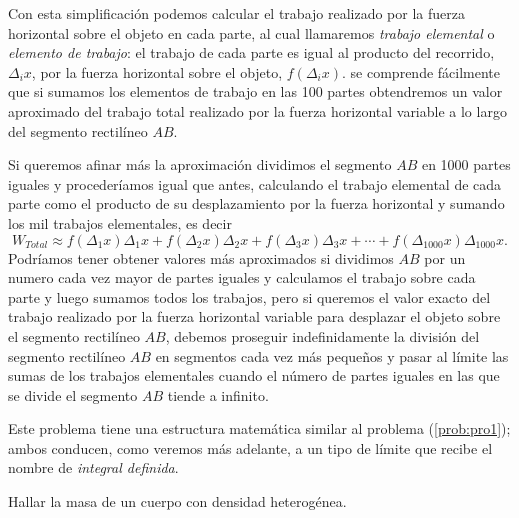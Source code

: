 \begin{solucion}
\begin{nota}
\end{nota}\vspace*{2pt} 

Con esta simplificación podemos calcular el trabajo realizado por
la fuerza horizontal sobre el objeto en cada parte, al cual llamaremos
\textsl{trabajo elemental} o \textsl{elemento de trabajo}: el trabajo
de cada parte es igual al producto del recorrido, $\Delta_{i}x$,
por la fuerza horizontal sobre el objeto, $f\left(\Delta_{i}x\right).$
se comprende fácilmente que si sumamos los elementos de trabajo en
las 100 partes obtendremos un valor aproximado del trabajo total realizado
por la fuerza horizontal variable a lo largo del segmento rectilíneo
$AB.$ 

Si queremos afinar más la aproximación dividimos el segmento $AB$
en 1000 partes iguales y procederíamos igual que antes, calculando
el trabajo elemental de cada parte como el producto de su desplazamiento
por la fuerza horizontal y sumando los mil trabajos elementales, es
decir 
\[
W_{Total}\approx f\left(\Delta_{1}x\right)\Delta_{1}x+f\left(\Delta_{2}x\right)\Delta_{2}x+f\left(\Delta_{3}x\right)\Delta_{3}x+\cdots+f\left(\Delta_{1000}x\right)\Delta_{1000}x.
\]
Podríamos tener obtener valores más aproximados si dividimos $AB$
por un numero cada vez mayor de partes iguales y calculamos el trabajo
sobre cada parte y luego sumamos todos los trabajos, pero si queremos
el valor exacto del trabajo realizado por la fuerza horizontal variable
para desplazar el objeto sobre el segmento rectilíneo $AB$, debemos
proseguir indefinidamente la división del segmento rectilíneo $AB$
en segmentos cada vez más pequeños y pasar al límite las sumas de
los trabajos elementales cuando el número de partes iguales en las
que se divide el segmento $AB$ tiende a infinito.

\end{solucion}

Este problema tiene una estructura matemática similar al problema
(\ref{prob:pro1}); ambos conducen, como veremos más adelante, a un
tipo de límite que recibe el nombre de\textsl{ integral definida}. 

\begin{problema}\label{prob:pro} 

Hallar la masa de un cuerpo con densidad heterogénea.

\end{problema}

